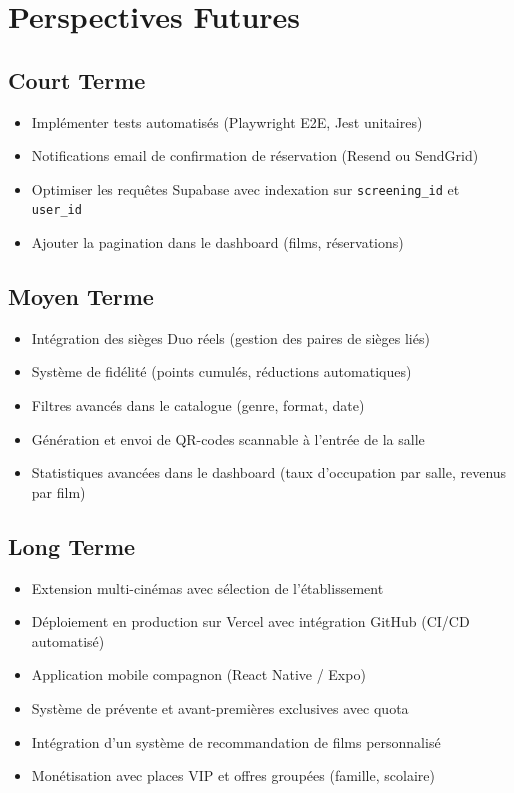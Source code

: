 \documentclass[12pt,a4paper,openany]{report}
\begin{document}
\chapter{Perspectives Futures}

\section{Court Terme}

\begin{itemize}
  \item Implémenter tests automatisés (Playwright E2E, Jest unitaires)
  \item Notifications email de confirmation de réservation (Resend ou SendGrid)
  \item Optimiser les requêtes Supabase avec indexation sur \texttt{screening\_id} et \texttt{user\_id}
  \item Ajouter la pagination dans le dashboard (films, réservations)
\end{itemize}

\section{Moyen Terme}

\begin{itemize}
  \item Intégration des sièges Duo réels (gestion des paires de sièges liés)
  \item Système de fidélité (points cumulés, réductions automatiques)
  \item Filtres avancés dans le catalogue (genre, format, date)
  \item Génération et envoi de QR-codes scannable à l'entrée de la salle
  \item Statistiques avancées dans le dashboard (taux d'occupation par salle, revenus par film)
\end{itemize}

\section{Long Terme}

\begin{itemize}
  \item Extension multi-cinémas avec sélection de l'établissement
  \item Déploiement en production sur Vercel avec intégration GitHub (CI/CD automatisé)
  \item Application mobile compagnon (React Native / Expo)
  \item Système de prévente et avant-premières exclusives avec quota
  \item Intégration d'un système de recommandation de films personnalisé
  \item Monétisation avec places VIP et offres groupées (famille, scolaire)
\end{itemize}
\end{document}
